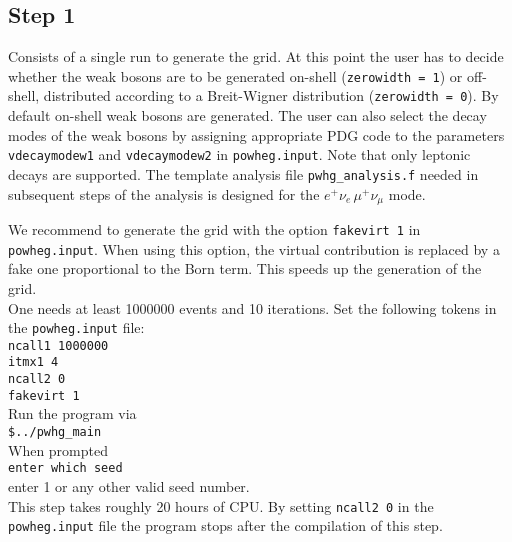 \documentclass[a4paper,11pt]{article}
\begin{document}
\subsection*{Step 1}
%
Consists of a single run to generate the grid. At this point the user
has to decide whether the weak bosons are to be generated on-shell
({\tt zerowidth = 1}) or off-shell, distributed according to a
Breit-Wigner distribution ({\tt zerowidth = 0}).  By default on-shell
weak bosons are generated. The user can also select the decay modes of
the weak bosons by assigning appropriate PDG code to the parameters
{\tt vdecaymodew1} and {\tt vdecaymodew2} in {\tt powheg.input}. Note
that only leptonic decays are supported. The template analysis file
{\tt pwhg\_analysis.f} needed in subsequent steps of the analysis is
designed for the $e^+\nu_e \,\mu^+\nu_{\mu}$ mode.

We recommend to generate the grid with the option {\tt fakevirt 1} in
{\tt powheg.input}. When using this option, the virtual contribution
is replaced by a fake one proportional to the Born term. This speeds
up the generation of the grid.
\\[2ex]
One needs at least 1000000 events and 10 iterations. Set the following
tokens in the {\tt powheg.input} file:
\\[2ex]
{\tt ncall1 1000000
  \\[2ex]
  itmx1 4
  \\[2ex]
  ncall2 0
  \\[2ex]
  fakevirt 1 }
\\[2ex]
Run the program via
\\[2ex]
{\tt \$../pwhg\_main}
\\[2ex]
When prompted
\\[2ex]
{\tt enter which seed}
\\[2ex]
enter 1 or any other valid seed number.
\\[2ex]
This step takes roughly 20 hours of CPU. By setting {\tt ncall2 0} in
the {\tt powheg.input} file the program stops after the compilation of
this step.

\end{document}
